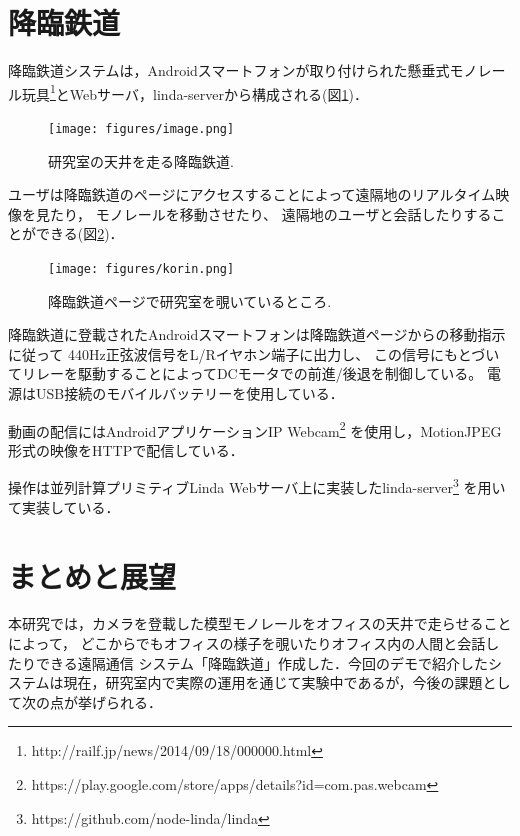 \documentclass[submit,techreq]{ipsj}
\begin{document}
\section{降臨鉄道}

降臨鉄道システムは，Androidスマートフォンが取り付けられた懸垂式モノレール玩具\footnote{
  \textsf{http://railf.jp/news/2014/09/18/000000.html}
}とWebサーバ，linda-server\cite{Shokai:Linda}から構成される(図\ref{monorail})．

\begin{figure}[H]
\begin{center}
\texttt{[image: figures/image.png]}
\end{center}
\caption{研究室の天井を走る降臨鉄道.}
\label{monorail}
\end{figure}

ユーザは降臨鉄道のページにアクセスすることによって遠隔地のリアルタイム映像を見たり，
モノレールを移動させたり、
遠隔地のユーザと会話したりすることができる(図\ref{browser})．

\begin{figure}[H]
\begin{center}
\texttt{[image: figures/korin.png]}
\end{center}
\caption{降臨鉄道ページで研究室を覗いているところ.}
\label{browser}
\end{figure}

降臨鉄道に登載されたAndroidスマートフォンは降臨鉄道ページからの移動指示に従って
440Hz正弦波信号をL/Rイヤホン端子に出力し、
この信号にもとづいてリレーを駆動することによってDCモータでの前進/後退を制御している。
電源はUSB接続のモバイルバッテリーを使用している．

動画の配信にはAndroidアプリケーションIP Webcam\footnote{
  \textsf{https://play.google.com/store/apps/details?id=com.pas.webcam}
}
を使用し，MotionJPEG形式の映像をHTTPで配信している．

操作は並列計算プリミティブLinda\cite{Carriero:1989:LC:63334.63337}
Webサーバ上に実装したlinda-server\footnote{
  \textsf{https://github.com/node-linda/linda}
}
を用いて実装している．

\section{まとめと展望}

本研究では，カメラを登載した模型モノレールをオフィスの天井で走らせることによって，
どこからでもオフィスの様子を覗いたりオフィス内の人間と会話したりできる遠隔通信
システム「降臨鉄道」作成した．今回のデモで紹介したシステムは現在，研究室内で実際の運用を通じて実験中であるが，今後の課題として次の点が挙げられる．
\end{document}
